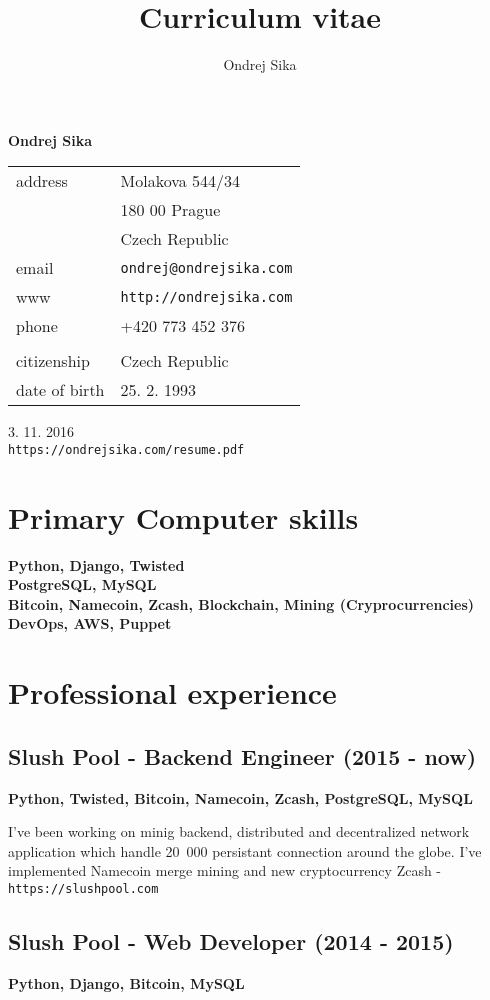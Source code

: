 \documentclass[12pt,a4paper]{article}
\title{Curriculum vitae}
\author{Ondrej Sika}
\begin{document}
\begin{center}
{\LARGE \bf Ondrej Sika}\\
\vspace*{0.4cm}
\begin{tabular}{R{5cm}L{5cm}}
address & Molakova 544/34\\
 & 180 00 Prague\\
 & Czech Republic\\
email & \texttt{ondrej@ondrejsika.com}\\
www & \texttt{http://ondrejsika.com}\\
phone & +420 773 452 376\\
\\
citizenship & Czech Republic\\
date of birth & 25. 2. 1993\\
\end{tabular}

\vspace*{0.5cm}
{\hfill 3. 11. 2016}\\
{\hfill \texttt{https://ondrejsika.com/resume.pdf}}
\end{center}

\section*{Primary Computer skills}
{\bf Python, Django, Twisted} \\
{\bf PostgreSQL, MySQL}  \\
{\bf Bitcoin, Namecoin, Zcash, Blockchain, Mining (Cryprocurrencies)}  \\
{\bf DevOps, AWS, Puppet}

\section*{Professional experience}
\subsection*{Slush Pool - Backend Engineer (2015 - now)}
{\bf Python, Twisted, Bitcoin, Namecoin, Zcash, PostgreSQL, MySQL}

I've been working on minig backend, distributed and decentralized network application which handle 20~000 persistant connection around the globe. I've implemented Namecoin merge mining and new cryptocurrency Zcash - \texttt{https://slushpool.com}

\subsection*{\large \bf Slush Pool - Web Developer (2014 - 2015)}
{\bf Python, Django, Bitcoin, MySQL}
\end{document}
